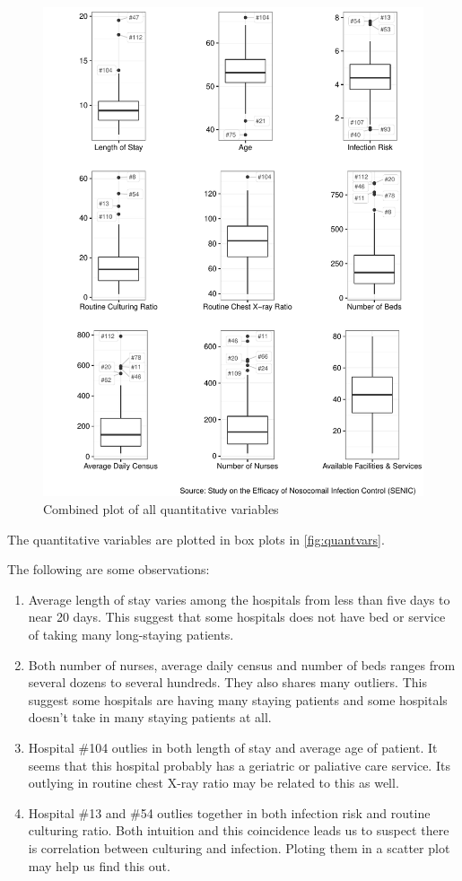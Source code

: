 \documentclass[11pt]{article}
\begin{document}
\begin{figure}[H]
  \centering
  \includegraphics[scale=0.8]{quantitative_vars.pdf}
  \caption{Combined plot of all quantitative variables}\label{fig:quantvars}
\end{figure}

The quantitative variables are plotted in box plots in \autoref{fig:quantvars}.

The following are some observations:
\begin{enumerate}
\item
  Average length of stay varies among the hospitals from less than five days to
  near 20 days. This suggest that some hospitals does not have bed or service of
  taking many long-staying patients.
\item
  Both number of nurses, average daily census and number of beds ranges from
  several dozens to several hundreds. They also shares many outliers. This suggest
  some hospitals are having many staying patients and some hospitals doesn't take
  in many staying patients at all.
\item
  Hospital \#104 outlies in both length of stay and average age of patient. It
  seems that this hospital probably has a geriatric or paliative care service.
  Its outlying in routine chest X-ray ratio may be related to this as well.
\item
  Hospital \#13 and \#54 outlies together in both infection risk and routine culturing
  ratio. Both intuition and this coincidence leads us to suspect there is correlation
  between culturing and infection. Ploting them in a scatter plot may help us find
  this out.
\end{enumerate}
\end{document}
